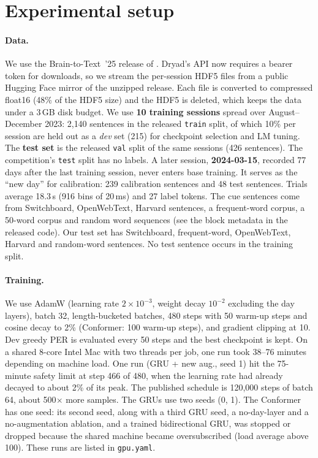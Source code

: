 \section{Experimental setup}
\label{sec:setup}

\paragraph{Data.} We use the Brain-to-Text~'25 release of \citet{card2024accurate} \citep{card2025dryad}. Dryad's API now requires a bearer token for downloads, so we stream the per-session HDF5 files from a public Hugging Face mirror of the unzipped release. Each file is converted to compressed float16 (48\% of the HDF5 size) and the HDF5 is deleted, which keeps the data under a 3\,GB disk budget.
We use \textbf{10 training sessions} spread over August--December 2023: 2{,}140 sentences in the released \texttt{train} split, of which 10\% per session are held out as a \emph{dev} set (215) for checkpoint selection and LM tuning. The \textbf{test set} is the released \texttt{val} split of the same sessions (426 sentences). The competition's \texttt{test} split has no labels.
A later session, \textbf{2024-03-15}, recorded 77 days after the last training session, never enters base training. It serves as the ``new day'' for calibration: 239 calibration sentences and 48 test sentences.
Trials average 18.3\,s (916 bins of 20\,ms) and 27 label tokens. The cue sentences come from Switchboard, OpenWebText, Harvard sentences, a frequent-word corpus, a 50-word corpus and random word sequences (see the block metadata in the released code). Our test set has \CorpusNSwitchboard{} Switchboard, \CorpusNFreqWords{} frequent-word, \CorpusNOpenwebtext{} OpenWebText, \CorpusNHarvard{} Harvard and \CorpusNRandom{} random-word sentences. No test sentence occurs in the training split.

\paragraph{Training.} We use AdamW (learning rate $2\times10^{-3}$, weight decay $10^{-2}$ excluding the day layers), batch 32, length-bucketed batches, 480 steps with 50 warm-up steps and cosine decay to 2\% (Conformer: 100 warm-up steps), and gradient clipping at 10. Dev greedy PER is evaluated every 50 steps and the best checkpoint is kept. On a shared 8-core Intel Mac with two threads per job, one run took 38--76 minutes depending on machine load. One run (GRU + new aug., seed 1) hit the 75-minute safety limit at step 466 of 480, when the learning rate had already decayed to about 2\% of its peak. The published schedule is 120{,}000 steps of batch 64, about 500$\times$ more samples.
The GRUs use two seeds (0, 1). The Conformer has one seed: its second seed, along with a third GRU seed, a no-day-layer and a no-augmentation ablation, and a trained bidirectional GRU, was stopped or dropped because the shared machine became oversubscribed (load average above 100). These runs are listed in \texttt{gpu.yaml}.

